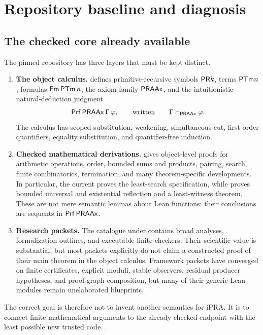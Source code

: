 \section{Repository baseline and diagnosis}\label{sec:baseline}

\subsection{The checked core already available}

The pinned repository has three layers that must be kept distinct.

\begin{enumerate}
\item \textbf{The object calculus.}   defines primitive-recursive symbols
\(\mathsf{PR} k\), terms \(\mathsf{PTm} n\), formulas \(\mathsf{Fm}\,\mathsf{PTm}\,n\), the axiom family \(\mathsf{PRAAx}\), and the
intuitionistic natural-deduction judgment
\[
   \mathsf{Prf}\,\mathsf{PRAAx}\,\Gamma\,\varphi,
   \qquad\text{written}\qquad \Gamma\vdash_{\mathsf{PRAAx}}\varphi.
\]
The calculus has scoped substitution, weakening, simultaneous cut, first-order quantifiers,
equality substitution, and quantifier-free induction.

\item \textbf{Checked mathematical derivations.}   gives object-level
proofs for arithmetic operations, order, bounded sums and products, pairing, search, finite
combinatorics, termination, and many theorem-specific developments.  In particular, the current
 proves the least-search specification, while
 proves bounded universal and existential reflection and a
least-witness theorem.  These are not mere semantic lemmas about Lean functions: their conclusions
are sequents in \(\mathsf{Prf}\,\mathsf{PRAAx}\).

\item \textbf{Research packets.}  The catalogue under  contains broad analyses,
formalization outlines, and executable finite checkers.  Their scientific value is substantial, but
most packets explicitly do not claim a constructed proof of their main theorem in the object
calculus.  Framework packets have converged on finite certificates, explicit moduli, stable
observers, residual producer hypotheses, and proof-graph composition, but many of their generic Lean
modules remain unelaborated blueprints.
\end{enumerate}

The correct goal is therefore not to invent another semantics for iPRA.  It is to connect finite
mathematical arguments to the already checked endpoint with the least possible new trusted code.

